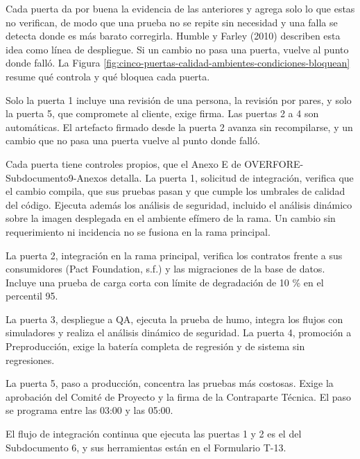 \documentclass[subdoc]{../../comun/overfore}
\begin{document}
Cada puerta da por buena la evidencia de las anteriores y agrega solo lo que estas no verifican, de modo que una prueba no se repite sin necesidad y una falla se detecta donde es más barato corregirla. Humble y Farley (2010) describen esta idea como línea de despliegue. Si un cambio no pasa una puerta, vuelve al punto donde falló. La Figura \ref{fig:cinco-puertas-calidad-ambientes-condiciones-bloquean} resume qué controla y qué bloquea cada puerta.

Solo la puerta 1 incluye una revisión de una persona, la revisión por pares, y solo la puerta 5, que compromete al cliente, exige firma. Las puertas 2 a 4 son automáticas. El artefacto firmado desde la puerta 2 avanza sin recompilarse, y un cambio que no pasa una puerta vuelve al punto donde falló.

Cada puerta tiene controles propios, que el Anexo E de OVERFORE-Subdocumento9-Anexos detalla. La puerta 1, solicitud de integración, verifica que el cambio compila, que sus pruebas pasan y que cumple los umbrales de calidad del código. Ejecuta además los análisis de seguridad, incluido el análisis dinámico sobre la imagen desplegada en el ambiente efímero de la rama. Un cambio sin requerimiento ni incidencia no se fusiona en la rama principal.

La puerta 2, integración en la rama principal, verifica los contratos frente a sus consumidores (Pact Foundation, s.f.) y las migraciones de la base de datos. Incluye una prueba de carga corta con límite de degradación de 10 \% en el percentil 95.

La puerta 3, despliegue a QA, ejecuta la prueba de humo, integra los flujos con simuladores y realiza el análisis dinámico de seguridad. La puerta 4, promoción a Preproducción, exige la batería completa de regresión y de sistema sin regresiones.

La puerta 5, paso a producción, concentra las pruebas más costosas. Exige la aprobación del Comité de Proyecto y la firma de la Contraparte Técnica. El paso se programa entre las 03:00 y las 05:00.

El flujo de integración continua que ejecuta las puertas 1 y 2 es el del Subdocumento 6, y sus herramientas están en el Formulario T-13.
\end{document}
